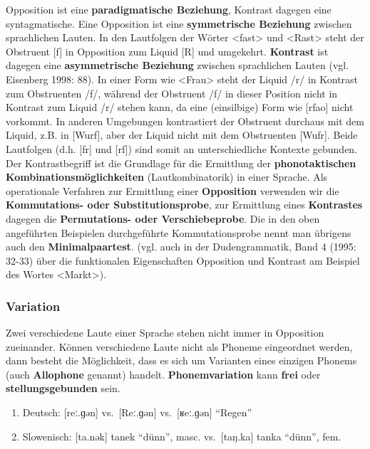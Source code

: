 \documentclass[
]{article}
\providecommand{\tightlist}{%
  \setlength{\itemsep}{0pt}\setlength{\parskip}{0pt}}
\begin{document}
Opposition ist eine \textbf{paradigmatische Beziehung}, Kontrast dagegen eine
syntagmatische. Eine Opposition ist eine \textbf{symmetrische Beziehung}
zwischen sprachlichen Lauten. In den Lautfolgen der Wörter \textless fast\textgreater{} und
\textless Rast\textgreater{} steht der Obstruent {[}f{]} in Opposition zum Liquid {[}R{]} und
umgekehrt. \textbf{Kontrast} ist dagegen eine \textbf{asymmetrische Beziehung}
zwischen sprachlichen Lauten (vgl. Eisenberg 1998: 88). In einer Form
wie \textless Frau\textgreater{} steht der Liquid /r/ in Kontrast zum Obstruenten /f/,
während der Obstruent /f/ in dieser Position nicht in Kontrast zum
Liquid /r/ stehen kann, da eine (einsilbige) Form wie {[}rfao{]} nicht
vorkommt. In anderen Umgebungen kontrastiert der Obstruent durchaus mit
dem Liquid\emph{,} z.B. in {[}Wurf{]}, aber der Liquid nicht mit dem Obstruenten
{[}Wufr{]}. Beide Lautfolgen (d.h. {[}fr{]} und {[}rf{]}) sind somit an
unterschiedliche Kontexte gebunden. Der Kontrastbegriff ist die
Grundlage für die Ermittlung der \textbf{phonotaktischen
Kombinationsmöglichkeiten} (Lautkombinatorik) in einer Sprache. Als
operationale Verfahren zur Ermittlung einer \textbf{Opposition} verwenden wir
die \textbf{Kommutations- oder Substitutionsprobe}, zur Ermittlung eines
\textbf{Kontrastes} dagegen die \textbf{Permutations- oder Verschiebeprobe}. Die
in den oben angeführten Beispielen durchgeführte Kommutationsprobe nennt
man übrigens auch den \textbf{Minimalpaartest}. (vgl. auch in der
Dudengrammatik, Band 4 (1995: 32-33) über die funktionalen Eigenschaften
Opposition und Kontrast am Beispiel des Wortes \textless Markt\textgreater).

\hypertarget{variation}{%
\subsubsection{Variation}\label{variation}}

Zwei verschiedene Laute einer Sprache stehen nicht immer in Opposition
zueinander. Können verschiedene Laute nicht als Phoneme eingeordnet
werden, dann besteht die Möglichkeit, dass es sich um Varianten eines
einzigen Phonems (auch \textbf{Allophone} genannt) handelt.
\textbf{Phonemvariation} kann \textbf{frei} oder \textbf{stellungsgebunden} sein.

\begin{enumerate}
\def\labelenumi{(\arabic{enumi})}
\setcounter{enumi}{10}
\tightlist
\item
  Deutsch: {[}reː.ɡən{]} vs.~{[}Reː.ɡən{]} vs.~{[}ʁeː.ɡən{]} ``Regen''
\item
  Slowenisch: {[}ta.nək{]} tanek ``dünn'', masc. vs.~{[}taŋ.ka{]} tanka ``dünn'',
  fem.
\end{enumerate}
\end{document}
